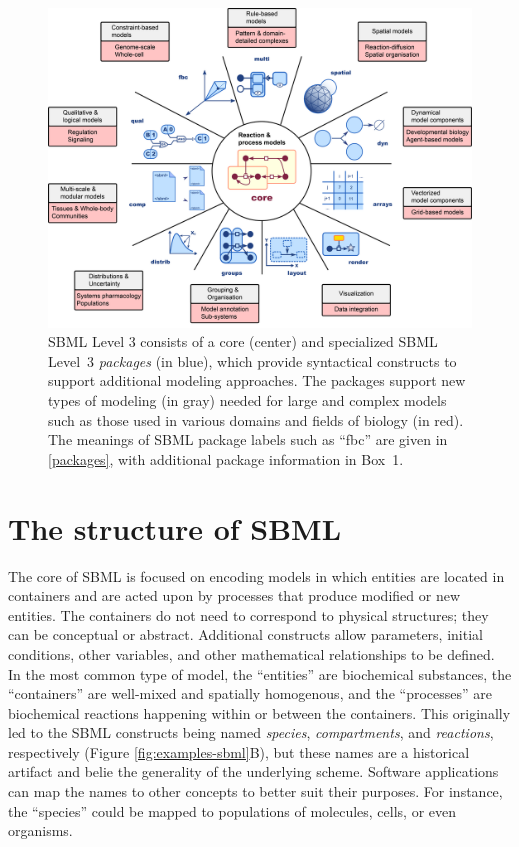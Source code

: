 \documentclass{sbml-paper}
\begin{document}
\begin{figure}[b]
  \center
  \includegraphics[width=\textwidth]{resources/SBML-Level3-v08.png}
\caption{SBML Level 3 consists of a core (center) and specialized SBML Level~3 \emph{packages} (in blue), which provide syntactical constructs to support additional modeling approaches. The packages support new types of modeling (in gray) needed for large and complex models such as those used in various domains and fields of biology (in red). The meanings of SBML package labels such as ``fbc'' are given in \autoref{packages}, with additional package information in Box~1.}
\label{level-3-diagram}
\end{figure}

\clearpage
\newpage

\section*{The structure of SBML}
\label{sec:sbml}

The core of SBML is focused on encoding models in which entities are located in containers and are acted upon by processes that produce modified or new entities.  The containers do not need to correspond to physical structures; they can be conceptual or abstract.  Additional constructs allow parameters, initial conditions, other variables, and other mathematical relationships to be defined.  In the most common type of model, the ``entities'' are biochemical substances, the ``containers'' are well-mixed and spatially homogenous, and the ``processes'' are biochemical reactions happening within or between the containers.  This originally led to the SBML constructs being named \emph{species}, \emph{compartments}, and \emph{reactions}, respectively (Figure \ref{fig:examples-sbml}B), but these names are a historical artifact and belie the generality of the underlying scheme.  Software applications can map the names to other concepts to better suit their purposes.  For instance, the ``species'' could be mapped to populations of molecules, cells, or even organisms.
\end{document}
